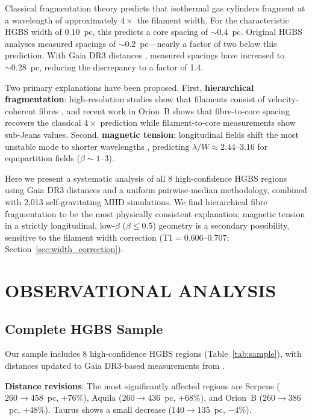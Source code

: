 \documentclass[twoside,twocolumn]{mnras}
\begin{document}
Classical fragmentation theory \citep{Inutsuka1992} predicts that isothermal gas cylinders
fragment at a wavelength of approximately $4\times$ the filament width. For the
characteristic HGBS width of $0.10$~pc, this predicts a core spacing of $\sim 0.4$~pc.
Original HGBS analyses measured spacings of $\sim 0.2$~pc---nearly a factor of two below
this prediction. With Gaia DR3 distances \citep{Zhang2023}, measured spacings have
increased to $\sim 0.28$~pc, reducing the discrepancy to a factor of 1.4.

Two primary explanations have been proposed. First, \textbf{hierarchical fragmentation}:
high-resolution studies show that filaments consist of velocity-coherent fibres
\citep{Hacar2013}, and recent work in Orion~B \citep{Yang2024} shows that fibre-to-core
spacing recovers the classical $4\times$ prediction while filament-to-core measurements
show sub-Jeans values. Second, \textbf{magnetic tension}: longitudinal fields shift the
most unstable mode to shorter wavelengths \citep{Nakamura1993}, predicting
$\lambda/W \approx 2.44$--$3.16$ for equipartition fields ($\beta \sim 1$--$3$).

Here we present a systematic analysis of all 8 high-confidence HGBS regions using Gaia DR3 distances and a uniform pairwise-median methodology, combined with 2,013 self-gravitating MHD simulations. We find hierarchical fibre fragmentation to be the most physically consistent explanation; magnetic tension in a strictly longitudinal, low-$\beta$ ($\beta \leq 0.5$) geometry is a secondary possibility, sensitive to the filament width correction (T1$=0.606$--$0.707$; Section~\ref{sec:width_correction}).

\section{OBSERVATIONAL ANALYSIS}

\subsection{Complete HGBS Sample}
\label{sec:sample}

Our sample includes 8 high-confidence HGBS regions (Table~\ref{tab:sample}), with
distances updated to Gaia DR3-based measurements from \citet{Zhang2023}.

\textbf{Distance revisions}: The most significantly affected regions are Serpens
($260 \to 458$~pc, $+76\%$), Aquila ($260 \to 436$~pc, $+68\%$), and Orion~B
($260 \to 386$~pc, $+48\%$). Taurus shows a small decrease ($140 \to 135$~pc, $-4\%$).
\end{document}
